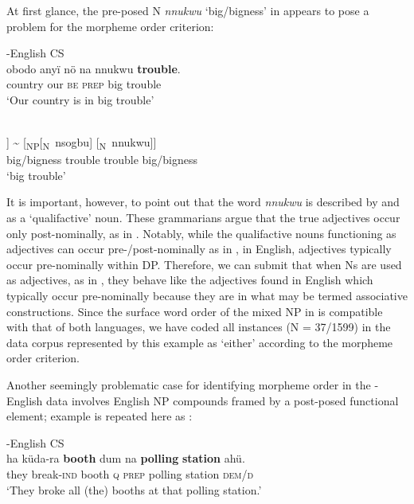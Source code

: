 \documentclass[output=paper]{langsci/langscibook}
\begin{document}
At first glance, the pre-posed  N \textit{nnukwu} ‘big/bigness’ in  appears to pose a problem for the morpheme order criterion:

\ea\label{ex:ihemere:12}
\ea\label{ex:ihemere:12a} -English CS\\
\gll obodo  anyï  nö    na  nnukwu  \textbf{trouble}.\\
     country  our    \textsc{be}  \textsc{prep} big     trouble\\
\glt ‘Our country is in big trouble’

\ex\label{ex:ihemere:12b}  \\
\gll [\textsubscript{NP}[\textsubscript{N}~nnukwu]  [\textsubscript{N}~nsogbu]] {\textasciitilde} [\textsubscript{NP}[\textsubscript{N}~nsogbu] [\textsubscript{N}~nnukwu]]  \\
	    {\hphantom{[\textsubscript{NP}[\textsubscript{N}~}}big/bigness  {\hphantom{[\textsubscript{N}~}}trouble   {}                {\hphantom{[\textsubscript{NP}[\textsubscript{N}~}}trouble       {\hphantom{[\textsubscript{N}~}}big/bigness    \\
\glt ‘big trouble’
\z
\z

It is important, however, to point out that the  word \textit{nnukwu} is described by \citet[47-8]{Emenanjo1978} and \citet[237]{MadukaDurunze1990} as a ‘qualifactive’ noun. These  grammarians argue that the  true adjectives occur only post-nominally, as in . Notably, while the  qualifactive nouns functioning as adjectives can occur pre-/post-nominally as in , in English, adjectives typically occur pre-nominally within DP. Therefore, we can submit that when  Ns are used as adjectives, as in , they behave like the adjectives found in English which typically occur pre-nominally because they are in what may be termed associative constructions. Since the surface word order of the mixed NP in  is compatible with that of both languages, we have coded all instances (N = 37/1599) in the data corpus represented by this example as ‘either’ according to the morpheme order criterion. 

Another seemingly problematic case for identifying morpheme order in the -English data involves English NP compounds framed by a post-posed  functional element; example  is repeated here as :

\ea\label{ex:ihemere:13}
{-English CS}\\
\gll ha    küda-ra  \textbf{booth} dum   na    \textbf{polling} \textbf{station} ahü.\\
     they break-\textsc{ind}  booth  \textsc{q}  \textsc{prep}  polling station   \textsc{dem/d}\\
\glt ‘They broke all (the) booths at that polling station.’   
\z
\end{document}
